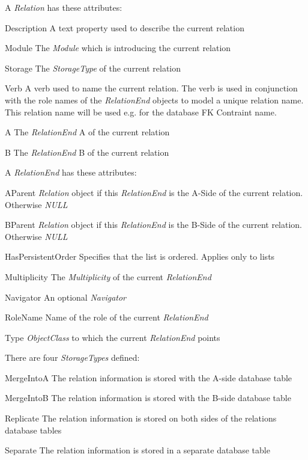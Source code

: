 A \emph{Relation} has these attributes:
\begin{descriptionBorder}
	\item[Description] 	{ A text property used to describe the current relation }
	\item[Module] 		{ The \emph{Module} which is introducing the current relation }
	\item[Storage] 		{ The \emph{StorageType} of the current relation }
	\item[Verb] 		{ 	A verb used to name the current relation. 
							The verb is used in conjunction with the role names of the \emph{RelationEnd} objects to model a unique relation name. 
							This relation name will be used e.g. for the database FK Contraint name.}
	\item[A] 			{ The \emph{RelationEnd} A of the current relation }
	\item[B] 			{ The \emph{RelationEnd} B of the current relation }
\end{descriptionBorder}

A \emph{RelationEnd} has these attributes:
\begin{descriptionBorder}
	\item[AParent] { \emph{Relation} object if this \emph{RelationEnd} is the A-Side of the current relation. Otherwise \emph{NULL} }
	\item[BParent] { \emph{Relation} object if this \emph{RelationEnd} is the B-Side of the current relation. Otherwise \emph{NULL} }
	\item[HasPersistentOrder] { Specifies that the list is ordered. Applies only to lists  }
	\item[Multiplicity] { The \emph{Multiplicity} of the current \emph{RelationEnd} }
	\item[Navigator] { An optional \emph{Navigator} }
	\item[RoleName] { Name of the role of the current \emph{RelationEnd} }
	\item[Type] { \emph{ObjectClass} to which the current \emph{RelationEnd} points }
\end{descriptionBorder}

There are four \emph{StorageTypes} defined:
\begin{descriptionBorder}
	\item[MergeIntoA] { The relation information is stored with the A-side database table }
	\item[MergeIntoB] { The relation information is stored with the B-side database table }
	\item[Replicate] { The relation information is stored on both sides of the relations database tables }
	\item[Separate] { The relation information is stored in a separate database table }
\end{descriptionBorder}

